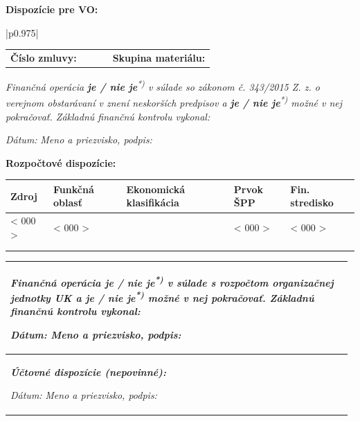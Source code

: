 \documentclass[10pt,a4paper]{article}
\newcommand{\placeholder}[1]{< #1 >}
\newcommand{\sppSymbol}{\placeholder{000}}
\newcommand{\source}{\placeholder{000}}
\newcommand{\functionalRegion}{\placeholder{000}}
\newcommand{\financialCentre}{\placeholder{000}}
\begin{document}
\vspace*{-0.5em}
\textbf{Dispozície pre VO:}
\vspace*{-1em}

\begin{table}[h!]
\centering
\begin{tabular}{|p{0.975\linewidth}|}
	\hline
	\begin{tabular}[c]{@{}p{0.5\linewidth}p{0.5\linewidth}@{}}
		\textbf{Číslo zmluvy:} & \textbf{Skupina materiálu:} \\
	\end{tabular}
	\textit{Finančná operácia \textbf{je / nie je}\textsuperscript{*)} v súlade so zákonom č. 343/2015 Z. z. o verejnom obstarávaní v znení neskorších predpisov a \textbf{je / nie je}\textsuperscript{*)} možné v nej pokračovať. Základnú finančnú kontrolu vykonal:}
	
	\textit{Dátum:} \hspace{2cm} \textit{Meno a priezvisko, podpis:} \\
	\hline
\end{tabular}
\end{table}

\vspace*{-0.5em}
\textbf{Rozpočtové dispozície:}
\vspace*{-1em}
\begin{table}[h!]
\centering
\begin{tabularx}{\linewidth}{|X|X|l|X|X|}
	\hline
	\textbf{Zdroj} & \textbf{Funkčná oblasť} & \textbf{Ekonomická klasifikácia} & \textbf{Prvok ŠPP} & \textbf{Fin. stredisko} \\ \hline
	\source & \functionalRegion & & \sppSymbol & \financialCentre \\ \hline
	& & & & \\ \hline
	& & & & \\ \hline
\end{tabularx}
\begin{tabular}{|p{0.975\linewidth}|}
	\textit{Finančná operácia \textbf{je / nie je}\textsuperscript{*)} v súlade s rozpočtom organizačnej jednotky UK a \textbf{je / nie je}\textsuperscript{*)} možné v nej pokračovať. Základnú finančnú kontrolu vykonal:}
	
	\textit{Dátum:} \hspace{2cm} \textit{Meno a priezvisko, podpis:} \\ \hline
	
	\textit{\textbf{Účtovné dispozície (nepovinné):}}
	
	\vspace*{1em}
	
	\textit{Dátum:} \hspace{2cm} \textit{Meno a priezvisko, podpis:} \\ \hline
\end{tabular}
\end{table}
\end{document}
